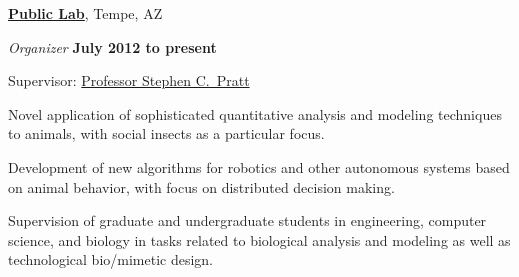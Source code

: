 \documentclass[10pt]{article}
\newcommand{\halfblankline}{\quad\vspace{-0.5\baselineskip}\pagebreak[3]}
\begin{document}
\href{http://www.asu.edu/}{\textbf{Public Lab}},
Tempe, AZ
\begin{outerlist}

    \item[] \textit{Organizer}%
            \hfill \textbf{July 2012 to present}
            \begin{innerlist}
                \item Supervisor:
                        \href{http://www.public.asu.edu/~spratt1/}%
                             {Professor Stephen C.~Pratt}

                \item Novel application of sophisticated quantitative
                    analysis and modeling techniques to animals, with
                    social insects as a particular focus.

                \item Development of new algorithms for robotics and
                    other autonomous systems based on animal behavior,
                    with focus on distributed decision making.

                \item Supervision of graduate and undergraduate students
                    in engineering, computer science, and biology in
                    tasks related to biological analysis and modeling as
                    well as technological bio\-/mimetic design.
            \end{innerlist}

\end{outerlist}

\halfblankline
\end{document}
